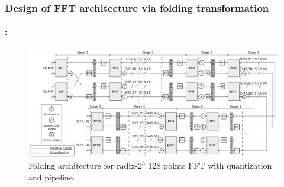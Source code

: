 \begin{frame}
	\frametitle{\textbf{Design of FFT architecture via folding transformation}}
	\framesubtitle{\secname : \subsecname}
	\vspace{-0.5cm}
		\begin{figure}[h!] \centering
		   	\includegraphics[width=0.95\paperwidth]{./image/folding-128-quant-pipe.pdf}
		   	\caption{ \tiny Folding architecture for radix-$2^3$ 128 points FFT with quantization and pipeline.}
		\end{figure}  	
\end{frame}